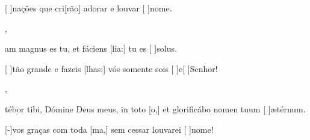 {        {\item {}[ ]{na}ções que cri[rão] adorar e louvar [ ]{no}me.},
    {\item {}am magnus es tu, et fáciens [lia:] tu es [ ]{so}lus.}%
        {\item {}[ ]{tão} grande e fazeis [lhas:] vós somente sois [ ]{e}[ ]{Se}nhor!},
    {\item {}tébor tibi, Dómine Deus meus, in toto [o,] et glorificábo nomen tuum [ ]{æ}{tér}num.}%
        {\item {}[-]{vos} graças com toda [ma,] sem cessar louvarei [ ]{no}me!}
}